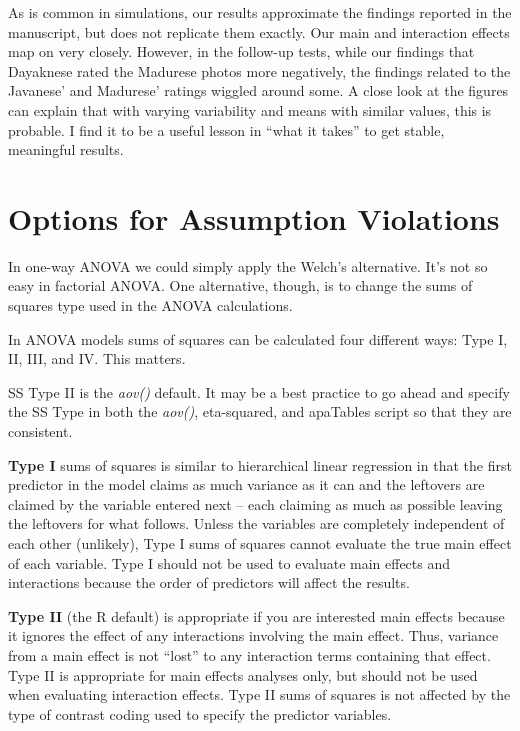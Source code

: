 \documentclass[
  11pt,
]{book}
\begin{document}
As is common in simulations, our results approximate the findings reported in the manuscript, but does not replicate them exactly. Our main and interaction effects map on very closely. However, in the follow-up tests, while our findings that Dayaknese rated the Madurese photos more negatively, the findings related to the Javanese' and Madurese' ratings wiggled around some. A close look at the figures can explain that with varying variability and means with similar values, this is probable. I find it to be a useful lesson in ``what it takes'' to get stable, meaningful results.

\hypertarget{options-for-assumption-violations}{%
\section{Options for Assumption Violations}\label{options-for-assumption-violations}}

In one-way ANOVA we could simply apply the Welch's alternative. It's not so easy in factorial ANOVA. One alternative, though, is to change the sums of squares type used in the ANOVA calculations.

In ANOVA models sums of squares can be calculated four different ways: Type I, II, III, and IV. This matters.

SS Type II is the \emph{aov()} default. It may be a best practice to go ahead and specify the SS Type in both the \emph{aov()}, eta-squared, and apaTables script so that they are consistent.

\textbf{Type I} sums of squares is similar to hierarchical linear regression in that the first predictor in the model claims as much variance as it can and the leftovers are claimed by the variable entered next -- each claiming as much as possible leaving the leftovers for what follows. Unless the variables are completely independent of each other (unlikely), Type I sums of squares cannot evaluate the true main effect of each variable. Type I should not be used to evaluate main effects and interactions because the order of predictors will affect the results.

\textbf{Type II} (the R default) is appropriate if you are interested main effects because it ignores the effect of any interactions involving the main effect. Thus, variance from a main effect is not ``lost'' to any interaction terms containing that effect. Type II is appropriate for main effects analyses only, but should not be used when evaluating interaction effects. Type II sums of squares is not affected by the type of contrast coding used to specify the predictor variables.
\end{document}

